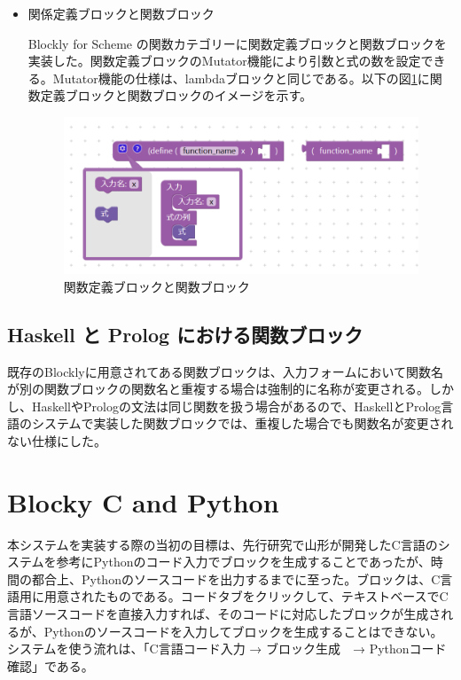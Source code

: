 \documentclass{risepaper}
\begin{document}
\begin{itemize}
\item 関係定義ブロックと関数ブロック

Blockly for Scheme の関数カテゴリーに関数定義ブロックと関数ブロックを実装した。関数定義ブロックのMutator機能により引数と式の数を設定できる。Mutator機能の仕様は、lambdaブロックと同じである。以下の図\ref{fig:scheme_func}に関数定義ブロックと関数ブロックのイメージを示す。

\begin{figure}[h]
\begin{center}
\includegraphics[scale=0.5]{img/scheme_func.PNG}
\caption{関数定義ブロックと関数ブロック}%
\label{fig:scheme_func}
\end{center}%
\end{figure}%

\end{itemize} 

   \subsection{Haskell と Prolog における関数ブロック}
   
既存のBlocklyに用意されてある関数ブロックは、入力フォームにおいて関数名が別の関数ブロックの関数名と重複する場合は強制的に名称が変更される。しかし、HaskellやPrologの文法は同じ関数を扱う場合があるので、HaskellとProlog言語のシステムで実装した関数ブロックでは、重複した場合でも関数名が変更されない仕様にした。

   \section{Blocky C and Python}
   
本システムを実装する際の当初の目標は、先行研究で山形が開発したC言語のシステムを参考にPythonのコード入力でブロックを生成することであったが、時間の都合上、Pythonのソースコードを出力するまでに至った。ブロックは、C言語用に用意されたものである。コードタブをクリックして、テキストベースでC言語ソースコードを直接入力すれば、そのコードに対応したブロックが生成されるが、Pythonのソースコードを入力してブロックを生成することはできない。システムを使う流れは、「C言語コード入力 → ブロック生成　→ Pythonコード確認」である。
\end{document}
